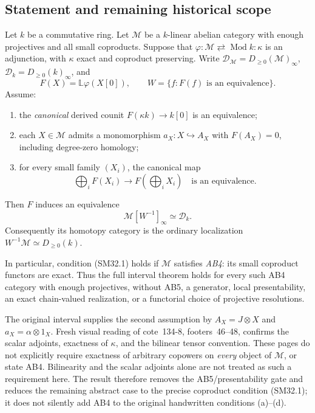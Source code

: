 \documentclass[11pt,a4paper]{article}
\theoremstyle{definition}\newtheorem{definition}[theorem]{Definition}
\theoremstyle{remark}\newtheorem{remark}[theorem]{Remark}
\begin{document}
\subsection{Statement and remaining historical scope}
Let \(k\) be a commutative ring.  Let \(\mathcal M\) be a
\(k\)-linear abelian category with enough projectives and all small
coproducts.  Suppose that
\(\varphi:\mathcal M\rightleftarrows\operatorname{Mod}k:\kappa\)
is an adjunction, with \(\kappa\) exact and coproduct preserving.
Write \(\mathcal D_{\mathcal M}=D_{\ge0}(\mathcal M)_\infty\),
\(\mathcal D_k=D_{\ge0}(k)_\infty\), and
\[
 F(X)=\mathbb L\varphi(X[0]),\qquad
 W=\{f:F(f)\text{ is an equivalence}\}.
\]
Assume:
\begin{enumerate}
\item the \emph{canonical} derived counit
\(F(\kappa k)\to k[0]\) is an equivalence;
\item each \(X\in\mathcal M\) admits a monomorphism
\(a_X:X\hookrightarrow A_X\) with \(F(A_X)=0\), including
degree-zero homology;
\item for every small family \((X_i)\), the canonical map
\[
       \bigoplus_i F(X_i)\longrightarrow
                         F\!\left(\bigoplus_iX_i\right)
                         \quad\text{is an equivalence}.       \tag{SM32.1}
\]
\end{enumerate}
Then \(F\) induces an equivalence
\[
        \mathcal M[W^{-1}]_\infty\simeq\mathcal D_k.            \tag{SM32.2}
\]
Consequently its homotopy category is the ordinary localization
\(W^{-1}\mathcal M\simeq D_{\ge0}(k)\).

In particular, condition (SM32.1) holds if \(\mathcal M\)
satisfies \emph{AB4}: its small coproduct functors are exact.
Thus the full interval theorem holds for every such AB4 category
with enough projectives, without AB5, a generator, local
presentability, an exact chain-valued realization, or a
functorial choice of projective resolutions.

The original interval supplies the second assumption by
\(A_X=J\otimes X\) and \(a_X=\alpha\otimes1_X\).
Fresh visual reading of cote~134-8, footers~46--48, confirms
the scalar adjoints, exactness of \(\kappa\), and the bilinear
tensor convention.  These pages do not explicitly require
exactness of arbitrary copowers on \emph{every} object of
\(\mathcal M\), or state AB4.  Bilinearity and the scalar
adjoints alone are not treated as such a requirement here.
The result therefore removes the AB5/presentability gate and
reduces the remaining abstract case to the precise coproduct
condition (SM32.1); it does not silently add AB4 to the original
handwritten conditions (a)--(d).
\end{document}
